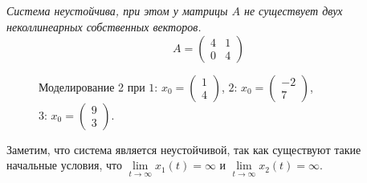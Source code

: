 \documentclass[a5paper, 10pt]{article}
\theoremstyle{definition}
\theoremstyle{plain}
\theoremstyle{remark}
\begin{document}
\subsection{}
\textit{Система неустойчива, при этом у матрицы $A$ не существует двух неколлинеарных собственных векторов.}
\begin{equation}
A=
\begin{pmatrix}
4 & 1\\
0 & 4
\end{pmatrix}
\end{equation}
\begin{figure}[h!]
\caption{Моделирование 2 при  $1: \, x_0 = \begin{pmatrix} 1 \\ 4 \end{pmatrix}$, $2: \, x_0 = \begin{pmatrix} -2 \\ 7 \end{pmatrix}$, $3: \, x_0 = \begin{pmatrix} 9 \\ 3 \end{pmatrix}$.}
\end{figure}

Заметим, что система является неустойчивой, так как существуют такие начальные условия, что $\lim \limits_{t \to \infty} x_1 (t) = \infty$ и $\lim \limits_{t \to \infty} x_2 (t) = \infty$.

\end{document}
